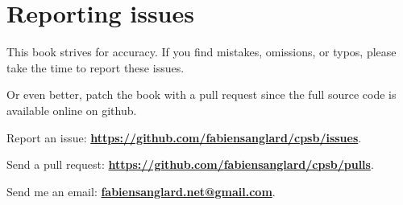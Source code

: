 \chapter*{Reporting issues}
This book strives for accuracy. If you find mistakes, omissions, or typos, please take the time to report these issues. 

Or even better, patch the book with a pull request since the full source code is available online on github.


Report an issue: \textbf{\href{https://github.com/fabiensanglard/cpsb/issues}{https://github.com/fabiensanglard/cpsb/issues}}.

Send a pull request: \textbf{\href{https://github.com/fabiensanglard/cpsb/pulls}{https://github.com/fabiensanglard/cpsb/pulls}}.

Send me an email: \textbf{\href{mailto:fabiensanglard.net@gmail.com}{fabiensanglard.net@gmail.com}}.
